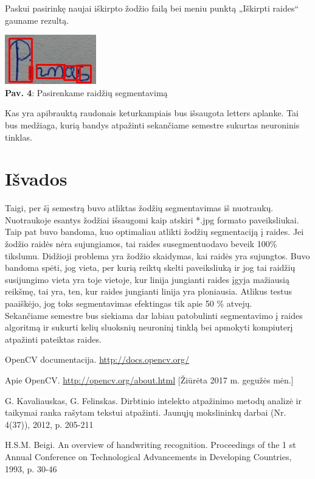 \documentclass[a4paper,12pt]{article}
\begin{document}
Paskui pasirinkę naujai iškirpto žodžio failą bei meniu punktą „Iškirpti raides“ gauname rezultą. 

\begin{center}
	\includegraphics[scale=0.7]{img/4.jpg}\\
	\textbf{Pav. 4}: Pasirenkame raidžių segmentavimą\\
\end{center}

Kas yra apibrauktą raudonais keturkampiais bus išsaugota letters aplanke. Tai bus medžiaga, kurią bandys atpažinti sekančiame semestre sukurtas neuroninis tinklas.

\clearpage
\section*{Išvados}
Taigi, per šį semestrą buvo atliktas žodžių segmentavimas iš nuotraukų. Nuotraukoje esantys žodžiai išsaugomi kaip atskiri *.jpg formato paveiksliukai. Taip pat buvo bandoma, kuo optimaliau atlikti žodžių segmentaciją į raides. Jei žodžio raidės nėra sujungiamos, tai raides susegmentuodavo beveik 100\% tikslumu. Didžioji problema yra žodžio skaidymas, kai raidės yra sujungtos. Buvo bandoma spėti, jog vieta, per kurią reiktų skelti paveiksliuką ir jog tai raidžių susijungimo vieta yra toje vietoje, kur linija jungianti raides įgyja mažiausią reikšmę, tai yra, ten, kur raides jungianti linija yra ploniausia. Atlikus testus paaiškėjo, jog toks segmentavimas efektingas tik apie 50 \% atvejų.\\
\indent Sekančiame semestre bus siekiama dar labiau patobulinti segmentavimo į raides algoritmą ir sukurti kelių sluoksnių neuroninį tinklą bei apmokyti kompiuterį atpažinti pateiktas raides.

\newpage
\renewcommand{\refname}{Literatūra}
\begin{thebibliography}{99}

OpenCV documentacija. 
\url{http://docs.opencv.org/}

Apie OpenCV.
\url{http://opencv.org/about.html}
[Žiūrėta 2017 m. gegužės mėn.]

G.  Kavaliauskas, G. Felinskas. Dirbtinio intelekto atpažinimo metodų analizė ir taikymai ranka rašytam tekstui atpažinti. Jaunųjų mokslininkų darbai  (Nr. 4(37)), 2012, p. 205-211

H.S.M. Beigi.  An overview of handwriting recognition. Proceedings of the 1 st Annual Conference on Technological Advancements in Developing Countries, 1993, p. 30-46

\end{thebibliography}
\end{document}
